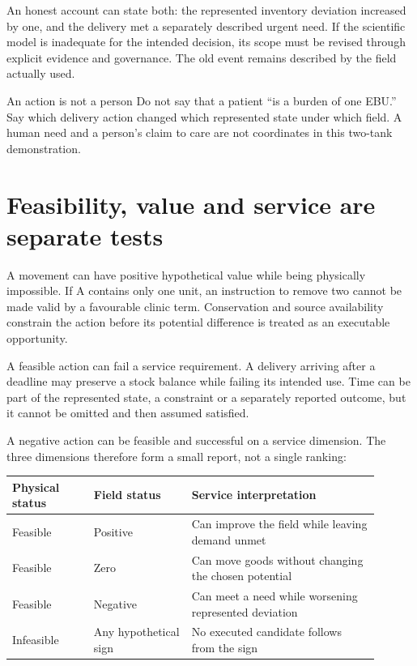 An honest account can state both: the represented inventory deviation increased by one, and the delivery met a separately described urgent need. If the scientific model is inadequate for the intended decision, its scope must be revised through explicit evidence and governance. The old event remains described by the field actually used.

\begin{cautionbox}{An action is not a person}
Do not say that a patient ``is a burden of one EBU.'' Say which delivery action changed which represented state under which field. A human need and a person's claim to care are not coordinates in this two-tank demonstration.
\end{cautionbox}

\section{Feasibility, value and service are separate tests}
A movement can have positive hypothetical value while being physically impossible. If A contains only one unit, an instruction to remove two cannot be made valid by a favourable clinic term. Conservation and source availability constrain the action before its potential difference is treated as an executable opportunity.

A feasible action can fail a service requirement. A delivery arriving after a deadline may preserve a stock balance while failing its intended use. Time can be part of the represented state, a constraint or a separately reported outcome, but it cannot be omitted and then assumed satisfied.

A negative action can be feasible and successful on a service dimension. The three dimensions therefore form a small report, not a single ranking:
\begin{center}\small
\begin{tabular}{P{0.20\linewidth}P{0.24\linewidth}P{0.46\linewidth}}\toprule
Physical status & Field status & Service interpretation\\\midrule
Feasible & Positive & Can improve the field while leaving demand unmet\\
Feasible & Zero & Can move goods without changing the chosen potential\\
Feasible & Negative & Can meet a need while worsening represented deviation\\
Infeasible & Any hypothetical sign & No executed candidate follows from the sign\\\bottomrule
\end{tabular}
\end{center}


